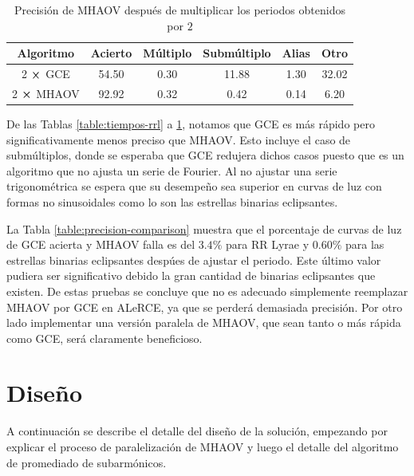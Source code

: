 \begin{table}[H]
\caption{Precisión de MHAOV después de multiplicar los periodos obtenidos por $2$}
\begin{tabular}{|c|c|c|c|c|c|}
    \hline
    Algoritmo & Acierto & Múltiplo & Submúltiplo & Alias & Otro \\ \hline
    2 $\cross$ GCE       & 54.50  & 0.30      & 11.88         & 1.30   & 32.02  \\ \hline
    2 $\cross$ MHAOV       & 92.92  & 0.32      & 0.42         & 0.14   & 6.20  \\ \hline
    \end{tabular}
    \label{table:precision-corrected}
\end{table}

De las Tablas \ref{table:tiempos-rrl} a \ref{table:precision-corrected}, notamos que GCE es más rápido pero significativamente menos preciso que MHAOV. Esto incluye el caso de submúltiplos, donde se esperaba que GCE redujera dichos casos puesto que es un algoritmo que no ajusta un serie de Fourier. Al no ajustar una serie trigonométrica se espera que su desempeño sea superior en curvas de luz con formas no sinusoidales como lo son las estrellas binarias eclipsantes. 

La Tabla \ref{table:precision-comparison} muestra que el porcentaje de curvas de luz de GCE acierta y MHAOV falla es del  $3.4\%$ para RR Lyrae y $0.60\%$ para las estrellas binarias eclipsantes despúes de ajustar el periodo. Este último valor pudiera ser significativo debido la gran cantidad de binarias eclipsantes que existen. De estas pruebas se concluye que no es adecuado simplemente reemplazar MHAOV por GCE en ALeRCE, ya que se perderá demasiada precisión. Por otro lado implementar una versión paralela de MHAOV, que sean tanto o más rápida como GCE, será claramente beneficioso.


\chapter{Diseño}\label{chap:diseño}
A continuación se describe el detalle del diseño de la solución, empezando por explicar el proceso de paralelización de MHAOV y luego el detalle del algoritmo de promediado de subarmónicos.


